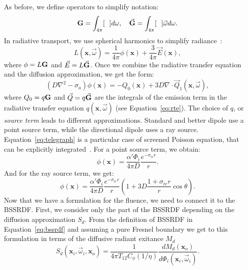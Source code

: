 As before, we define operators to simplify notation:
\begin{equation*}
\operator{G} = \int_{4\pi} [\ \ ] d\omega, \ \ \ \vec{\operator{G}} = \int_{4\pi} [\ \ ] \vec{\omega} d\omega.
\end{equation*}
In radiative transport, we use spherical harmonics to simplify radiance~\cite{Eason1978}:
\begin{equation*}
L(\mathbf{x}, \vec{\omega}) = \frac{1}{4\pi}\phi(\mathbf{x}) + \frac{3}{4\pi} \vec{E}(\mathbf{x}),
\end{equation*}
where $\phi = L \mathbf{G}$ and $\vec{E} = L \vec{\mathbf{G}}$. Once we combine the radiative transfer equation and the diffusion approximation, we get the form:
\begin{equation}
\label{eq:telegraph}
(D \nabla^2 - \sigma_a)\phi(\mathbf{x}) = -Q_0(\mathbf{x}) + 3D \nabla \cdot \vec{Q}_1(\mathbf{x}, \vec{\omega}),
\end{equation}
where $Q_0 = q \mathbf{G}$ and $\vec{Q} = q \vec{\mathbf{G}}$ are the integrals of the emission term in the radiative transfer equation $q(\mathbf{x}, \vec{\omega})$ (see Equation~\ref{eq:rte}). The choice of $q$, or \emph{source term} leads to different approximations. Standard and better dipole use a point source term, while the directional dipole uses a ray source. Equation~\ref{eq:telegraph} is a particular case of screened Poisson equation, that can be explicitly integrated~\cite{Fetter2003}. For a point source term, we obtain:
\begin{equation}
\label{eq:fluencepoint}
\phi(\mathbf{x}) = \frac{\alpha' \Phi_i}{4 \pi D} \frac{e^{-\sigma_{tr} r}}{r}.
\end{equation}
And for the ray source term, we get:
\begin{equation}
\label{eq:fluenceray}
\phi(\mathbf{x}) = \frac{\alpha' \Phi_i}{4 \pi D} \frac{e^{-\sigma_{tr} r}}{r} \left(1 + 3D \frac{1 + \sigma_{tr} r}{r} \cos\theta \right).
\end{equation}
Now that we have a formulation for the fluence, we need to connect it to the BSSRDF. First, we consider only the part of the BSSRDF depending on the diffusion approximation $S_d$. From the definition of BSSRDF in Equation~\ref{eq:bssrdf} and assuming a pure Fresnel boundary we get to this formulation in terms of the diffusive radiant exitance $M_d$
\begin{equation*}
S_d(\mathbf{x}_i, \vec{\omega}_i, \mathbf{x}_o)  =  \frac{1}{4\pi T_{12}C_\phi(1/\eta)} \frac{d M_d(\mathbf{x}_o)}{d \Phi_i(\mathbf{x}_i, \vec{\omega}_i)} .
\end{equation*} 
